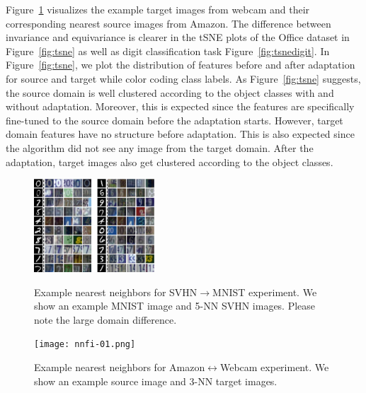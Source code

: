 Figure~\ref{fig:nnoffice} visualizes the example target images from webcam and their corresponding nearest source images from Amazon. The difference between invariance and equivariance is clearer in the tSNE plots of the Office dataset in Figure~\ref{fig:tsne} as well as digit classification task Figure~\ref{fig:tsnedigit}. In Figure~\ref{fig:tsne}, we plot the distribution of features before and after adaptation for source and target while color coding class labels. As Figure~\ref{fig:tsne} suggests, the source domain is well clustered according to the object classes with and without adaptation. Moreover, this is expected since the features are specifically fine-tuned to the source domain before the adaptation starts. However, target domain features have no structure before adaptation. This is also expected since the algorithm did not see any image from the target domain. After the adaptation, target images also get clustered according to the object classes. 

\begin{figure}
\begin{small}
\includegraphics[width=0.4\textwidth]{nndig}
\vspace{-5mm}
\caption{Example nearest neighbors for SVHN$\rightarrow$MNIST experiment. We show an example MNIST image and 5-NN SVHN images. Please note the large domain difference.}
\label{fig:nn}
\texttt{[image: nnfi-01.png]}
\caption{Example nearest neighbors for Amazon$\leftrightarrow$Webcam experiment. We show an example source image and 3-NN target images. }
\label{fig:nnoffice}
\end{small}
\vspace{-1cm}
\end{figure}


